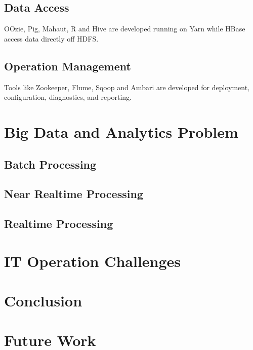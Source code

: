 \documentclass[11pt, oneside]{article}   	%
\begin{document}
\subsection{Data Access}
OOzie, Pig, Mahaut, R and Hive are developed running on Yarn while HBase access data directly off HDFS.

\subsection{Operation Management}
Tools like Zookeeper, Flume, Sqoop and Ambari are developed for deployment, configuration, diagnostics, and reporting. 

\section{Big Data and Analytics Problem}
\subsection{Batch Processing}
\subsection{Near Realtime Processing}
\subsection{Realtime Processing}

\section{IT Operation Challenges}

\section{Conclusion}

\section{Future Work}



\end{document}
